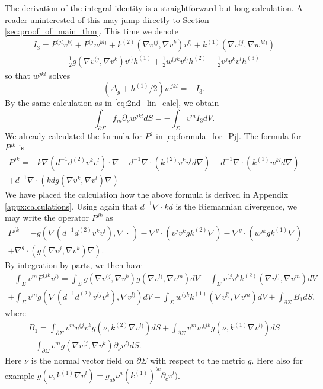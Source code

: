 \documentclass[12pt]{amsart}
\def\p{\partial}
\theoremstyle{definition}
\theoremstyle{remark}
\newcommand{\ccdot}{\,\cdot\,}
\begin{document}
The derivation of the integral identity is a straightforward but long calculation. A reader uninterested of this may jump directly to Section \ref{sec:proof_of_main_thm}. 
This time we denote
\begin{multline}\label{eq:I3}
 I_3=P^{(jl}v^{k)}+P^{(j}w^{kl)} +k^{(2)}(\nabla v^{(j},\nabla v^{k})v^{l)}+k^{(1)}(\nabla v^{(j},\nabla w^{kl)}) \\
  \qquad\quad+\frac{1}{2}g(\nabla v^{(j},\nabla v^{k})v^{l)}h^{(1)} +\frac{1}{2}w^{(jk}v^{l)}h^{(2)}+\frac{1}{2}v^{j}v^{k}v^{l}h^{(3)}
\end{multline}
so that $w^{jkl}$ solves
\[
 (\Delta_g+h^{(1)}/2)w^{jkl}=-I_3.
\]
By the same calculation as in \eqref{eq:2nd_lin_calc}, we obtain
\begin{equation}\label{eq:3rd_lin_calc}
 \int_{\p \Sigma}f_m\p_\nu w^{jkl}dS=-\int_\Sigma v^m I_3dV.
\end{equation}
We already calculated the formula for $P^j$ in \eqref{eq:formula_for_Pj}. The formula for $P^{jk}$ is 
\begin{multline}\label{eq:formula_for_Pjk}
 P^{jk}=
-k\nabla (d^{-1}d^{(2)}v^k v^l)\cdot \nabla-d^{-1}\nabla\cdot (k^{(2)}v^kv^ld \nabla)-d^{-1}\nabla\cdot (k^{(1)}w^{kl}d \nabla)
 \\
 +d^{-1}\nabla\cdot (kd g(\nabla v^k,\nabla v^l)\nabla)
\end{multline}
We have placed the calculation how the above formula is derived in Appendix \ref{appx:calculations}. 
Using again that $d^{-1}\nabla\cdot k d$ is the Riemannian divergence, we may write the operator $P^{jk}$ as
\begin{multline*}
  P^{jk}=-g(\nabla (d^{-1}d^{(2)}v^k v^l), \nabla \ccdot)
  -\nabla^g\cdot (v^jv^k gk^{(2)}\nabla) 
 -\nabla^g\cdot (w^{jk}gk^{(1)} \nabla) \\
  +\nabla^g\cdot (g(\nabla v^j,\nabla v^k)\nabla). 
\end{multline*}
 By integration by parts, we then have
\begin{multline}\label{eq:integral_P_jk}
 -\int_\Sigma v^mP^{(jk}v^{l)}=\int_{\Sigma}g(\nabla v^{(j},\nabla v^k)g(\nabla v^{l)},\nabla v^m) dV-\int_{\Sigma}v^{(j}v^{k} k^{(2)}(\nabla v^{l)},\nabla v^m) dV \\
  +\int_{\Sigma}v^m g(\nabla (d^{-1}d^{(2)}v^{(j}v^k),\nabla v^{l)})dV-\int_{\Sigma}w^{(jk}k^{(1)}(\nabla v^{l)},\nabla v^m)dV + \int_{\p \Sigma}B_1dS,
\end{multline}
where
\begin{multline}\label{eq:defs_for_B2}
B_1=\int_{\p \Sigma} v^mv^{(j}v^k g(\nu,k^{(2)}\nabla v^{l)})dS+\int_{\p \Sigma} v^mw^{(jk} g(\nu,k^{(1)}\nabla v^{l)})dS\\
-\int_{\p \Sigma} v^mg(\nabla v^{(j},\nabla v^k)\p_\nu v^{l)}dS.
\end{multline}
Here $\nu$ is the normal vector field on $\p \Sigma$ with respect to the metric $g$. Here also for example $g(\nu,k^{(1)}\nabla v^{l})=g_{ab}\nu^a(k^{(1)})^{bc}\p_cv^{l})$.
\end{document}
